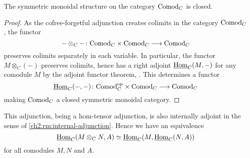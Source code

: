     



\begin{lemma}
    The symmetric monoidal structure on the category $\mathrm{Comod}_C$ is closed. 
\end{lemma}
\begin{proof}
    As the cofree-forgetful adjunction creates colimits in the category $\mathrm{Comod}_C$, the functor 
    \[-\otimes_C- \colon \mathrm{Comod}_C \times \mathrm{Comod}_C \longrightarrow \mathrm{Comod}_C\] 
    preserves colimits separately in each variable. In particular, the functor $M\otimes_C (-)$ preserves colimits, hence has a right adjoint $\operatorname{\underline{Hom}}_C(M,-)$ for any comodule $M$ by the adjoint functor theorem, \cite[5.5.2.9]{lurie_09}. This determines a functor 
    \[\operatorname{\underline{Hom}}_C(-,-)\colon \mathrm{Comod}_C^{\mathrm{op}}\times \mathrm{Comod}_C\longrightarrow \mathrm{Comod}_C\]
    making $\mathrm{Comod}_C$ a closed symmetric monoidal category.  
\end{proof}

\begin{remark}
    This adjunction, being a hom-tensor adjunction, is also internally adjoint in the sense of \cref{ch2:rm:internal-adjunction}. Hence we have an equivalence 
    \[\operatorname{\underline{Hom}}_C(M\otimes_C N, A) \simeq \operatorname{\underline{Hom}}_C(M, \operatorname{\underline{Hom}}_C(N, A))\]
    for all comodules $M, N$ and $A$. 
\end{remark}

